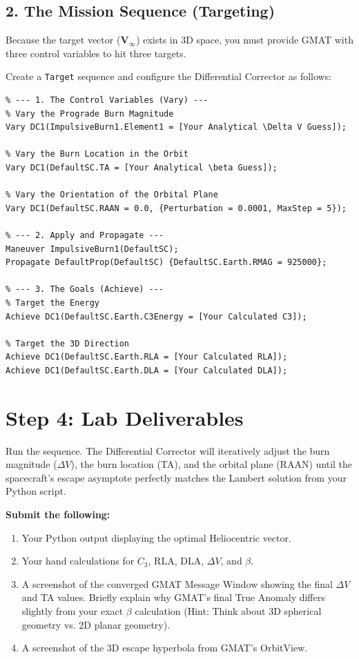 \documentclass[12pt]{article}
\begin{document}
\subsection*{2. The Mission Sequence (Targeting)}
Because the target vector ($\mathbf{V}_\infty$) exists in 3D space, you must provide GMAT with three control variables to hit three targets.

Create a \texttt{Target} sequence and configure the Differential Corrector as follows:

\begin{lstlisting}
% --- 1. The Control Variables (Vary) ---
% Vary the Prograde Burn Magnitude
Vary DC1(ImpulsiveBurn1.Element1 = [Your Analytical \Delta V Guess]);

% Vary the Burn Location in the Orbit
Vary DC1(DefaultSC.TA = [Your Analytical \beta Guess]);

% Vary the Orientation of the Orbital Plane
Vary DC1(DefaultSC.RAAN = 0.0, {Perturbation = 0.0001, MaxStep = 5});

% --- 2. Apply and Propagate ---
Maneuver ImpulsiveBurn1(DefaultSC);
Propagate DefaultProp(DefaultSC) {DefaultSC.Earth.RMAG = 925000};

% --- 3. The Goals (Achieve) ---
% Target the Energy
Achieve DC1(DefaultSC.Earth.C3Energy = [Your Calculated C3]);

% Target the 3D Direction
Achieve DC1(DefaultSC.Earth.RLA = [Your Calculated RLA]);
Achieve DC1(DefaultSC.Earth.DLA = [Your Calculated DLA]);
\end{lstlisting}

\section*{Step 4: Lab Deliverables}
Run the sequence. The Differential Corrector will iteratively adjust the burn magnitude ($\Delta V$), the burn location (TA), and the orbital plane (RAAN) until the spacecraft's escape asymptote perfectly matches the Lambert solution from your Python script.

\textbf{Submit the following:}
\begin{enumerate}
    \item Your Python output displaying the optimal Heliocentric vector.
    \item Your hand calculations for $C_3$, RLA, DLA, $\Delta V$, and $\beta$.
    \item A screenshot of the converged GMAT Message Window showing the final $\Delta V$ and TA values. Briefly explain why GMAT's final True Anomaly differs slightly from your exact $\beta$ calculation (Hint: Think about 3D spherical geometry vs. 2D planar geometry).
    \item A screenshot of the 3D escape hyperbola from GMAT's OrbitView.
\end{enumerate}
\end{document}
